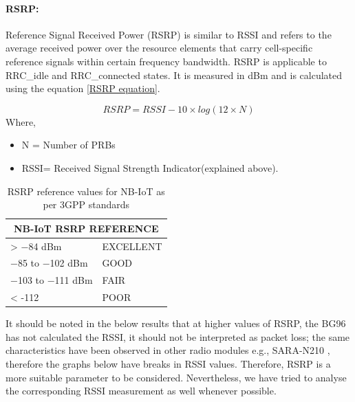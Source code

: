 \documentclass[12pt]{article}
\begin{document}

\paragraph{RSRP:}
Reference Signal Received Power (RSRP) is similar to RSSI and refers to the average received power over the resource elements that carry cell-specific reference signals within  certain  frequency  bandwidth. RSRP is applicable to RRC\_idle and RRC\_connected  states. It is measured in dBm and is calculated using the equation \ref{RSRP equation}.

\begin{equation}
    RSRP = {{RSSI - 10\times log (12\times N) }}
    \label{RSRP equation}
\end{equation}
Where, 
\begin{itemize}
    \item N = Number of PRBs 
    \item RSSI= Received Signal Strength Indicator(explained above).
\end{itemize}



\begin{table}[h]
\caption {RSRP reference values for NB-IoT as per 3GPP standards \cite{3GPP,sikora2019performance}}
\centering

\begin{tabular}{|p{5cm}|p{5cm}|}
\hline
\multicolumn{2}{|c|}{NB-IoT RSRP REFERENCE} \\ \hline
> −84 dBm                            & EXCELLENT                    \\ \hline
−85 to −102 dBm                      & GOOD                         \\ \hline
−103 to −111 dBm                     & FAIR                         \\ \hline
< -112                               & POOR                         \\ \hline
\end{tabular}
\label{nbiotRSRP}
\end{table}




It should be noted in the below results that at higher values of RSRP, the BG96 has not calculated the RSSI, it should not be interpreted as packet loss; the same characteristics have been observed in other radio modules e.g., SARA-N210 \cite{basu2019experimental}, therefore the graphs below have breaks in RSSI values. Therefore, RSRP is a more suitable parameter to be considered. Nevertheless, we have tried to analyse the corresponding RSSI measurement as well whenever possible.
\end{document}
